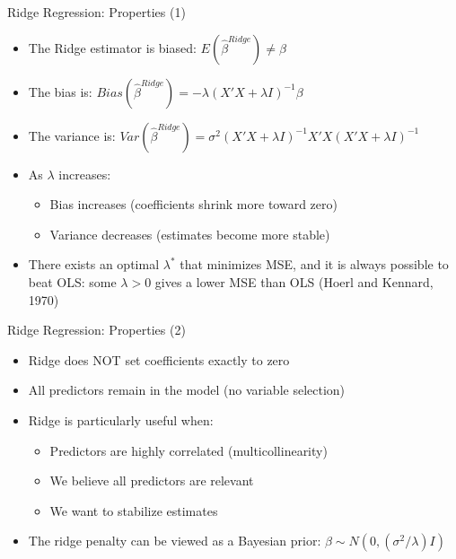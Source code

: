 \documentclass[aspectratio=169]{beamer}
\begin{document}
\begin{frame}{Ridge Regression: Properties (1)}
\begin{itemize}
    \item The Ridge estimator is biased: $E(\hat{\beta}^{Ridge}) \neq \beta$
    \item The bias is: $Bias(\hat{\beta}^{Ridge}) = -\lambda(X'X + \lambda I)^{-1}\beta$
    \item The variance is: $Var(\hat{\beta}^{Ridge}) = \sigma^2(X'X + \lambda I)^{-1}X'X(X'X + \lambda I)^{-1}$
    \item As $\lambda$ increases:
    \begin{itemize}
        \item Bias increases (coefficients shrink more toward zero)
        \item Variance decreases (estimates become more stable)
    \end{itemize}
    \item There exists an optimal $\lambda^*$ that minimizes MSE, and it is always possible to beat OLS: some $\lambda > 0$ gives a lower MSE than OLS (Hoerl and Kennard, 1970)
\end{itemize}
\end{frame}

\begin{frame}{Ridge Regression: Properties (2)}
\begin{itemize}
    \item Ridge does NOT set coefficients exactly to zero
    \item All predictors remain in the model (no variable selection)
    \item Ridge is particularly useful when:
    \begin{itemize}
        \item Predictors are highly correlated (multicollinearity)
        \item We believe all predictors are relevant
        \item We want to stabilize estimates
    \end{itemize}
    \item The ridge penalty can be viewed as a Bayesian prior: $\beta \sim N(0, (\sigma^2/\lambda) I)$
\end{itemize}
\end{frame}
\end{document}
